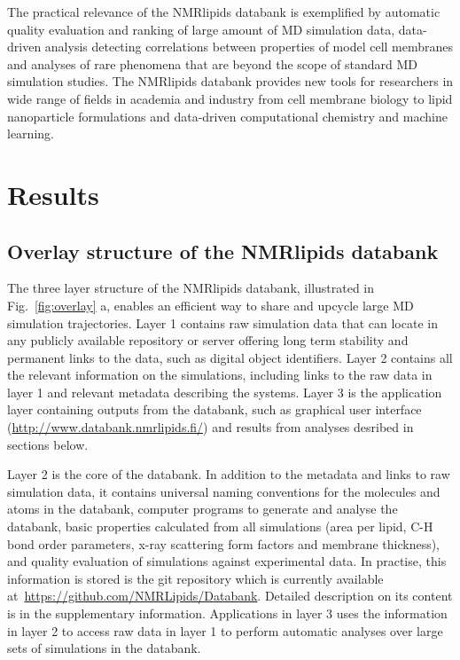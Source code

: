 \documentclass[fleqn,10pt]{wlscirep}
\begin{document}
The practical relevance of the NMRlipids databank is exemplified by automatic quality evaluation and ranking of large amount of MD simulation data, data-driven analysis detecting correlations between properties of model cell membranes and analyses of rare phenomena that are beyond the scope of standard MD simulation studies. The NMRlipids databank provides new tools for researchers in wide range of fields in academia and industry from cell membrane biology to lipid nanoparticle formulations and data-driven computational chemistry and machine learning. 


\section{Results}

\subsection{Overlay structure of the NMRlipids databank}
The three layer structure of the NMRlipids databank, illustrated in Fig.~\ref{fig:overlay} a, enables an efficient way to share and upcycle large MD simulation trajectories.  Layer 1 contains raw simulation data that can locate in any publicly available repository or server offering long term stability and permanent links to the data, such as digital object identifiers. Layer 2 contains all the relevant information on the simulations, including links to the raw data in layer 1 and relevant metadata describing the systems. Layer 3 is the application layer containing outputs from the databank, such as graphical user interface (\url{http://www.databank.nmrlipids.fi/}) and results from analyses desribed in sections below.   

Layer 2 is the core of the databank. In addition to the metadata and links to raw simulation data, it contains universal naming conventions for the molecules and atoms in the databank, computer programs to generate and analyse the databank, basic properties calculated from all simulations (area per lipid, C-H bond order parameters, x-ray scattering form factors and membrane thickness), and quality evaluation of simulations against experimental data. In practise, this information is stored is the git repository which is currently available at~\url{https://github.com/NMRLipids/Databank}.
Detailed description on its content is in the supplementary information. Applications in layer 3 uses the information in layer 2 to access raw data in layer 1 to perform automatic analyses over large sets of simulations in the databank. 
\end{document}
